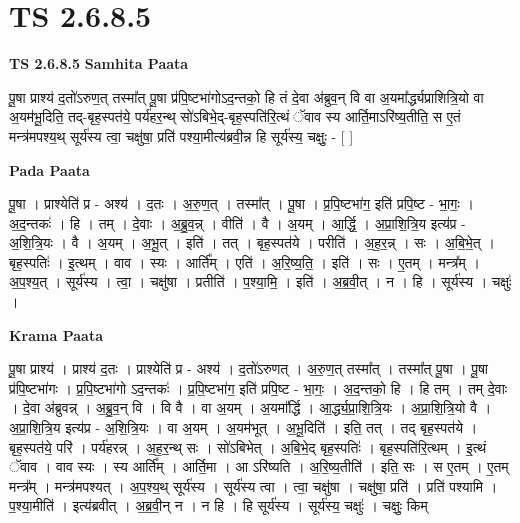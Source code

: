 \documentclass[17pt]{extarticle}
\begin{document}
\section*{ TS 2.6.8.5 }

\textbf{TS 2.6.8.5 } \newline
\textbf{Samhita Paata} \newline

पू॒षा प्राश्य॑ द॒तो॑ऽरुण॒त् तस्मा᳚त् पू॒षा प्र॑पि॒ष्टभा॑गोऽद॒न्तको॒ हि तं दे॒वा अ॑ब्रुव॒न् वि वा अ॒यमा᳚र्द्ध्यप्राशित्रि॒यो वा अ॒यम॑भू॒दिति॒ तद्-बृह॒स्पत॑ये॒ पर्य॑हर॒न्थ् सो॑ऽबिभे॒द्-बृह॒स्पति॑रि॒त्थं ॅवाव स्य आर्ति॒माऽरि॑ष्य॒तीति॒ स ए॒तं मन्त्र॑मपश्य॒थ् सूर्य॑स्य त्वा॒ चक्षु॑षा॒ प्रति॑ पश्या॒मीत्य॑ब्रवी॒न्न हि सूर्य॑स्य॒ चक्षुः॒ - [  ] \newline

\textbf{Pada Paata} \newline

पू॒षा । प्राश्येति॑ प्र - अश्य॑ । द॒तः । अ॒रु॒ण॒त् । तस्मा᳚त् । पू॒षा । प्र॒पि॒ष्टभा॑ग॒ इति॑ प्रपि॒ष्ट - भा॒गः॒ । अ॒द॒न्तकः॑ । हि । तम् । दे॒वाः । अ॒ब्रु॒व॒न्न् । वीति॑ । वै । अ॒यम् । आ॒र्द्धि॒ । अ॒प्रा॒शि॒त्रि॒य इत्य॑प्र - अ॒शि॒त्रि॒यः । वै । अ॒यम् । अ॒भू॒त् । इति॑ । तत् । बृह॒स्पत॑ये । परीति॑ । अ॒ह॒र॒न्न् । सः । अ॒बि॒भे॒त् । बृह॒स्पतिः॑ । इ॒त्थम् । वाव । स्यः । आर्ति᳚म् । एति॑ । अ॒रि॒ष्य॒ति॒ । इति॑ । सः । ए॒तम् । मन्त्र᳚म् । अ॒प॒श्य॒त् । सूर्य॑स्य । त्वा॒ । चक्षु॑षा । प्रतीति॑ । प॒श्या॒मि॒ । इति॑ । अ॒ब्र॒वी॒त् । न । हि । सूर्य॑स्य । चक्षुः॑ ।  \newline


\textbf{Krama Paata} \newline

पू॒षा प्राश्य॑ । प्राश्य॑ द॒तः । प्राश्येति॑ प्र - अश्य॑ । द॒तो॑ऽरुणत् । अ॒रु॒ण॒त् तस्मा᳚त् । तस्मा᳚त् पू॒षा । पू॒षा प्र॑पि॒ष्टभा॑गः । प्र॒पि॒ष्टभा॑गो ऽद॒न्तकः॑ । प्र॒पि॒ष्टभा॑ग॒ इति॑ प्रपि॒ष्ट - भा॒गः॒ । अ॒द॒न्तको॒ हि । हि तम् । तम् दे॒वाः । दे॒वा अ॑ब्रुवन्न् । अ॒ब्रु॒व॒न् वि । वि वै । वा अ॒यम् । अ॒यमा᳚र्द्धि । आ॒र्द्ध्य॒प्रा॒शि॒त्रि॒यः । अ॒प्रा॒शि॒त्रि॒यो वै । अ॒प्रा॒शि॒त्रि॒य इत्य॑प्र - अ॒शि॒त्रि॒यः । वा अ॒यम् । अ॒यम॑भूत् । अ॒भू॒दिति॑ । इति॒ तत् । तद् बृह॒स्पत॑ये । बृह॒स्पत॑ये॒ परि॑ । पर्य॑हरन्न् । अ॒ह॒र॒न्थ् सः । सो॑ऽबिभेत् । अ॒बि॒भे॒द् बृह॒स्पतिः॑ । बृह॒स्पति॑रि॒त्थम् । इ॒त्थं ॅवाव । वाव स्यः । स्य आर्ति᳚म् । आर्ति॒मा । आ ऽरि॑ष्यति । अ॒रि॒ष्य॒तीति॑ । इति॒ सः । स ए॒तम् । ए॒तम् मन्त्र᳚म् । मन्त्र॑मपश्यत् । अ॒प॒श्य॒थ् सूर्य॑स्य । सूर्य॑स्य त्वा । त्वा॒ चक्षु॑षा । चक्षु॑षा॒ प्रति॑ । प्रति॑ पश्यामि । प॒श्या॒मीति॑ । इत्य॑ब्रवीत् । अ॒ब्र॒वी॒न् न । न हि । हि सूर्य॑स्य । सूर्य॑स्य॒ चक्षुः॑ । चक्षुः॒ किम् \newline
\end{document}
